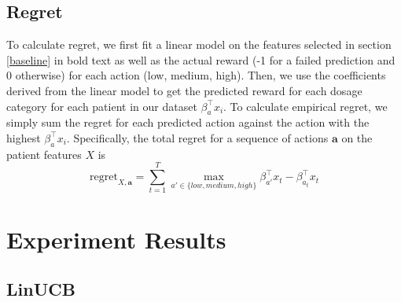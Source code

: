 \documentclass{article}
\begin{document}
\subsection{Regret}

To calculate regret, we first fit a linear model on the features selected in section \ref{baseline} in bold text as well as the actual reward (-1 for a failed prediction and 0 otherwise) for each action (low, medium, high). Then, we use the coefficients derived from the linear model to get the predicted reward for each dosage category for each patient in our dataset $\beta_a^\top x_i$. To calculate empirical regret, we simply sum the regret for each predicted action against the action with the highest $\beta_a^\top x_i$. Specifically, the total regret for a sequence of actions $\mathbf{a}$ on the patient features $X$ is 
\begin{equation}
	\text{regret}_{X, \mathbf{a}} = \sum_{t=1}^T \max_{a'\in\{low, medium, high\}}\beta_{a'}^\top x_t - \beta_{a_t}^\top x_t
\end{equation}

\section{Experiment Results}
\subsection{LinUCB}
\end{document}
